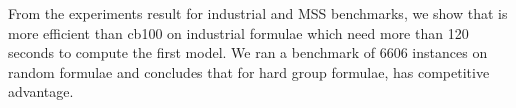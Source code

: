 \medskip

From the experiments result for industrial and MSS benchmarks, we show that \tool is more efficient than cb100 on industrial formulae which need more than 120 seconds to compute the first model. We ran a benchmark of 6606 instances on random formulae and concludes that for hard group formulae, \tool has competitive advantage.





